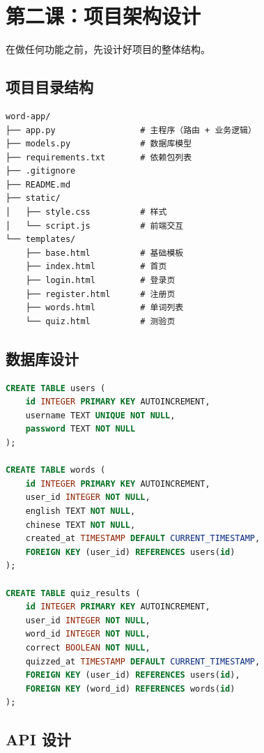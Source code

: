\documentclass[a4paper,12pt]{ctexart}
\begin{document}
\section*{第二课：项目架构设计}

在做任何功能之前，先设计好项目的整体结构。

\subsection*{项目目录结构}

\begin{verbatim}
word-app/
├── app.py                 # 主程序（路由 + 业务逻辑）
├── models.py              # 数据库模型
├── requirements.txt       # 依赖包列表
├── .gitignore
├── README.md
├── static/
│   ├── style.css          # 样式
│   └── script.js          # 前端交互
└── templates/
    ├── base.html          # 基础模板
    ├── index.html         # 首页
    ├── login.html         # 登录页
    ├── register.html      # 注册页
    ├── words.html         # 单词列表
    └── quiz.html          # 测验页
\end{verbatim}

\subsection*{数据库设计}

\begin{lstlisting}[language=SQL]
CREATE TABLE users (
    id INTEGER PRIMARY KEY AUTOINCREMENT,
    username TEXT UNIQUE NOT NULL,
    password TEXT NOT NULL
);

CREATE TABLE words (
    id INTEGER PRIMARY KEY AUTOINCREMENT,
    user_id INTEGER NOT NULL,
    english TEXT NOT NULL,
    chinese TEXT NOT NULL,
    created_at TIMESTAMP DEFAULT CURRENT_TIMESTAMP,
    FOREIGN KEY (user_id) REFERENCES users(id)
);

CREATE TABLE quiz_results (
    id INTEGER PRIMARY KEY AUTOINCREMENT,
    user_id INTEGER NOT NULL,
    word_id INTEGER NOT NULL,
    correct BOOLEAN NOT NULL,
    quizzed_at TIMESTAMP DEFAULT CURRENT_TIMESTAMP,
    FOREIGN KEY (user_id) REFERENCES users(id),
    FOREIGN KEY (word_id) REFERENCES words(id)
);
\end{lstlisting}

\subsection*{API 设计}
\end{document}
